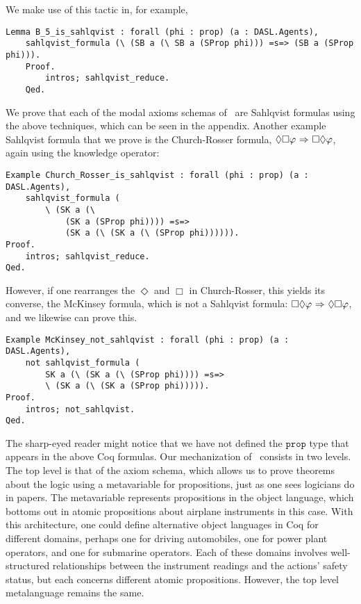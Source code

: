 We make use of this tactic in, for example,

\begin{tcolorbox}
	\begin{lstlisting}[language=Coq]
	Lemma B_5_is_sahlqvist : forall (phi : prop) (a : DASL.Agents),
	sahlqvist_formula (\ (SB a (\ SB a (SProp phi))) =s=> (SB a (SProp phi))).
	Proof.
		intros; sahlqvist_reduce. 
	Qed.
	\end{lstlisting}
\end{tcolorbox}

We prove that each of the modal axioms schemas of \DASL\ are Sahlqvist formulas using the above techniques, which can be seen in the appendix. Another example Sahlqvist formula that we prove is the Church-Rosser formula, $\Diamond\Box\varphi {\ \Rightarrow \ } \Box\Diamond\varphi$, again using the knowledge operator:

\begin{tcolorbox}
	\begin{lstlisting}[language=Coq]
Example Church_Rosser_is_sahlqvist : forall (phi : prop) (a : DASL.Agents),
	sahlqvist_formula (
		\ (SK a (\ 
			(SK a (SProp phi)))) =s=> 
			(SK a (\ (SK a (\ (SProp phi)))))).
Proof.
	intros; sahlqvist_reduce.
Qed.
	\end{lstlisting}
\end{tcolorbox}

However, if one rearranges the $\Diamond$ and $\Box$ in Church-Rosser, this yields its converse, the McKinsey formula, which is not a Sahlqvist formula: $\Box\Diamond\varphi {\ \Rightarrow \ } \Diamond \Box \varphi$, and we likewise can prove this.

\begin{tcolorbox}
	\begin{lstlisting}[language=Coq]
Example McKinsey_not_sahlqvist : forall (phi : prop) (a : DASL.Agents),
	not sahlqvist_formula (
		SK a (\ (SK a (\ (SProp phi)))) =s=> 
		\ (SK a (\ (SK a (SProp phi))))).
Proof.
	intros; not_sahlqvist.  
Qed.
	\end{lstlisting}
\end{tcolorbox}

The sharp-eyed reader might notice that we have not defined the $\mathtt{prop}$ type that appears in the above Coq formulas. Our mechanization of \DASL\ consists in two levels. The top level is that of the axiom schema, which allows us to prove theorems about the logic using a metavariable for propositions, just as one sees logicians do in papers. The metavariable represents propositions in the object language, which bottoms out in atomic propositions about airplane instruments in this case. With this architecture, one could define alternative object languages in Coq for different domains, perhaps one for driving automobiles, one for power plant operators, and one for submarine operators. Each of these domains involves well-structured relationships between the instrument readings and the actions' safety status, but each concerns different atomic propositions. However, the top level metalanguage remains the same.


